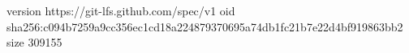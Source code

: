 version https://git-lfs.github.com/spec/v1
oid sha256:c094b7259a9cc356ec1cd18a224879370695a74db1fc21b7e22d4bf919863bb2
size 309155
